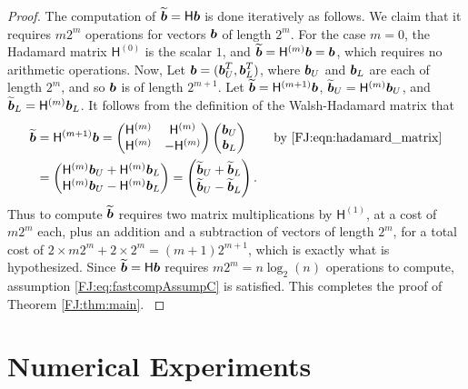 \documentclass[graybox,footinfo]{svmult}
\begin{document}
\begin{proof}
{The computation of $\widetilde{{\boldsymbol{b}}} =\mathsf{H} {\boldsymbol{b}}$ is done iteratively as follows.  We claim that it requires $m2^m$ operations for vectors ${\boldsymbol{b}}$ of length $2^m$. For the case $m=0$, the Hadamard matrix $\mathsf{H}^{(0)}$ is the scalar $1$, and $\widetilde{{\boldsymbol{b}}} = \mathsf{H}^{(m)} {\boldsymbol{b}} = {\boldsymbol{b}}$, which requires no arithmetic operations.  Now, Let ${\boldsymbol{b}} = ({\boldsymbol{b}}_U^{T},  {\boldsymbol{b}}_L^{T})$, where ${\boldsymbol{b}}_U$ and ${\boldsymbol{b}}_L$ are each of length $2^m$, and so ${\boldsymbol{b}}$ is of length $2^{m+1}$.  Let $\widetilde{{\boldsymbol{b}}} = \mathsf{H}^{(m+1)} {\boldsymbol{b}}$,  $\widetilde{{\boldsymbol{b}}}_U = \mathsf{H}^{(m)} {\boldsymbol{b}}_U$, and $\widetilde{{\boldsymbol{b}}}_L = \mathsf{H}^{(m)} {\boldsymbol{b}}_L$.  It follows from the definition of the Walsh-Hadamard matrix that 
\begin{align*}
\widetilde{{\boldsymbol{b}}} &= \mathsf{H}^{({m+1})} {\boldsymbol{b}} = \begin{pmatrix}
\mathsf{H}^{(m)} & \mathsf{H}^{(m)} \\ \mathsf{H}^{(m)} & - \mathsf{H}^{(m)}
\end{pmatrix} 
\begin{pmatrix}
{\boldsymbol{b}}_U\\ {\boldsymbol{b}}_L
\end{pmatrix} \qquad \text{by \eqref{FJ:eqn:hadamard_matrix}} \\
&= 
\begin{pmatrix}
\mathsf{H}^{(m)} {\boldsymbol{b}}_U + \mathsf{H}^{(m)}{\boldsymbol{b}}_L \\ 
\mathsf{H}^{(m)} {\boldsymbol{b}}_U - \mathsf{H}^{(m)} {\boldsymbol{b}}_L
\end{pmatrix}
= 
\begin{pmatrix}
\widetilde{{\boldsymbol{b}}}_U + \widetilde{{\boldsymbol{b}}}_L \\ 
\widetilde{{\boldsymbol{b}}}_U - \widetilde{{\boldsymbol{b}}}_L
\end{pmatrix}.
\end{align*}
Thus to compute $\widetilde{{\boldsymbol{b}}}$ requires two matrix multiplications by $\mathsf{H}^{(1)}$, at a cost of $m 2^m$ each, plus an addition and a subtraction of vectors of length $2^m$, for a total cost of $2 \times m 2^m + 2 \times 2^m = (m+1) 2^{m+1}$, which is exactly what is hypothesized.  Since $\widetilde{{\boldsymbol{b}}} =\mathsf{H} {\boldsymbol{b}}$ requires $m2^m = n \log_2(n)$ operations to compute, assumption \eqref{FJ:eq:fastcompAssumpC} is satisfied.  This completes the proof of Theorem \ref{FJ:thm:main}.
}
\end{proof}




\section{Numerical Experiments}
\end{document}
